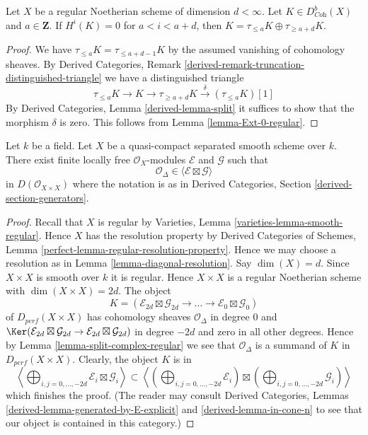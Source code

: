 \begin{lemma}
\label{lemma-split-complex-regular}
Let $X$ be a regular Noetherian scheme of dimension $d < \infty$.
Let $K \in D^b_{\textit{Coh}}(X)$ and $a \in \mathbf{Z}$.
If $H^i(K) = 0$ for $a < i < a + d$, then
$K = \tau_{\leq a}K \oplus \tau_{\geq a + d}K$.
\end{lemma}

\begin{proof}
We have $\tau_{\leq a}K = \tau_{\leq a + d - 1}K$ by the assumed
vanishing of cohomology sheaves. By Derived Categories, Remark
\ref{derived-remark-truncation-distinguished-triangle}
we have a distinguished triangle
$$
\tau_{\leq a}K \to K \to \tau_{\geq a + d}K \xrightarrow{\delta}
(\tau_{\leq a}K)[1]
$$
By Derived Categories, Lemma \ref{derived-lemma-split} it
suffices to show that the morphism $\delta$ is zero.
This follows from Lemma \ref{lemma-Ext-0-regular}.
\end{proof}

\begin{lemma}
\label{lemma-diagonal-trick}
Let $k$ be a field. Let $X$ be a quasi-compact separated smooth scheme over $k$.
There exist finite locally free $\mathcal{O}_X$-modules
$\mathcal{E}$ and $\mathcal{G}$ such that
$$
\mathcal{O}_\Delta \in \langle \mathcal{E} \boxtimes \mathcal{G} \rangle
$$
in $D(\mathcal{O}_{X \times X})$ where the notation is as in
Derived Categories, Section \ref{derived-section-generators}.
\end{lemma}

\begin{proof}
Recall that $X$ is regular by
Varieties, Lemma \ref{varieties-lemma-smooth-regular}.
Hence $X$ has the resolution property by
Derived Categories of Schemes, Lemma
\ref{perfect-lemma-regular-resolution-property}.
Hence we may choose a resolution as in Lemma \ref{lemma-diagonal-resolution}.
Say $\dim(X) = d$. Since $X \times X$ is smooth over $k$ it is regular.
Hence $X \times X$ is a regular Noetherian scheme with
$\dim(X \times X) = 2d$. The object
$$
K = (\mathcal{E}_{2d} \boxtimes \mathcal{G}_{2d} \to
\ldots \to
\mathcal{E}_0 \boxtimes \mathcal{G}_0)
$$
of $D_{perf}(X \times X)$ has cohomology sheaves $\mathcal{O}_\Delta$
in degree $0$ and $\Ker(\mathcal{E}_{2d} \boxtimes \mathcal{G}_{2d} \to
\mathcal{E}_{2d} \boxtimes \mathcal{G}_{2d})$ in degree $-2d$ and zero
in all other degrees.
Hence by Lemma \ref{lemma-split-complex-regular} we see that
$\mathcal{O}_\Delta$ is a summand of $K$ in $D_{perf}(X \times X)$.
Clearly, the object $K$ is in
$$
\left\langle
\bigoplus\nolimits_{i, j = 0, \ldots, -2d} \mathcal{E}_i \boxtimes \mathcal{G}_i
\right\rangle
\subset
\left\langle
\left(\bigoplus\nolimits_{i, j = 0, \ldots, -2d} \mathcal{E}_i\right)
\boxtimes
\left(\bigoplus\nolimits_{i, j = 0, \ldots, -2d} \mathcal{G}_i\right)
\right\rangle
$$
which finishes the proof. (The reader may consult
Derived Categories, Lemmas \ref{derived-lemma-generated-by-E-explicit} and
\ref{derived-lemma-in-cone-n} to see that our object is contained in this
category.)
\end{proof}

